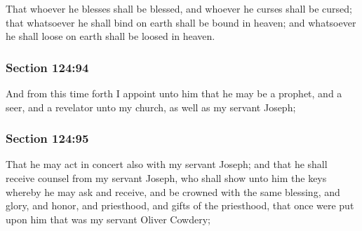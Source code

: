 		That whoever he blesses shall be blessed, and whoever he curses shall be cursed; that whatsoever he shall bind on earth shall be bound in heaven; and whatsoever he shall loose on earth shall be loosed in heaven.


	\subsubsection{Section 124:94} %
		\label{DC124-94}

		And from this time forth I appoint unto him that he may be a prophet, and a seer, and a revelator unto my church, as well as my servant Joseph;


	\subsubsection{Section 124:95} %
		\label{DC124-95}

		That he may act in concert also with my servant Joseph; and that he shall receive counsel from my servant Joseph, who shall show unto him the keys whereby he may ask and receive, and be crowned with the same blessing, and glory, and honor, and priesthood, and gifts of the priesthood, that once were put upon him that was my servant Oliver Cowdery;


